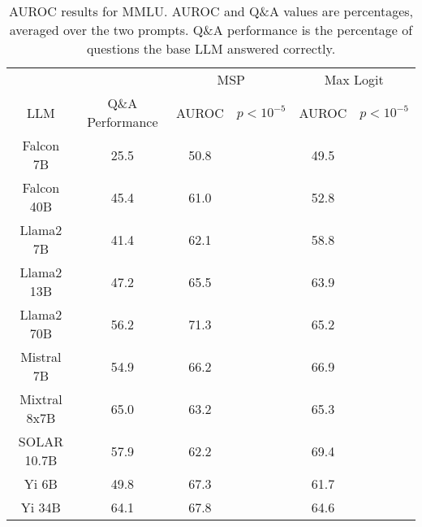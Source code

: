 \begin{table*}
\centering
\begin{tabular}{c|c|c|c|c|c}
& & \multicolumn{2}{c|}{MSP} & \multicolumn{2}{c}{Max Logit} \\ 
LLM & Q\&A Performance & AUROC & $p < 10^{-5}$ & AUROC & $p < 10^{-5}$\\ \hline
Falcon 7B & 25.5 & 50.8 &  & 49.5 & \\
Falcon 40B & 45.4 & 61.0 &  & 52.8 & \\
Llama2 7B & 41.4 & 62.1 &  & 58.8 & \\
Llama2 13B & 47.2 & 65.5 &  & 63.9 & \\
Llama2 70B & 56.2 & 71.3 &  & 65.2 & \\
Mistral 7B & 54.9 & 66.2 &  & 66.9 & \\
Mixtral 8x7B & 65.0 & 63.2 &  & 65.3 & \\
SOLAR 10.7B & 57.9 & 62.2 &  & 69.4 & \\
Yi 6B & 49.8 & 67.3 &  & 61.7 & \\
Yi 34B & 64.1 & 67.8 &  & 64.6 & \\
\hline
\end{tabular}
\caption{AUROC results for MMLU. AUROC and Q\&A values are percentages, averaged over the two prompts. Q\&A performance is the percentage of questions the base LLM answered correctly.}
\label{tab:mmlu_auroc}
\end{table*}
